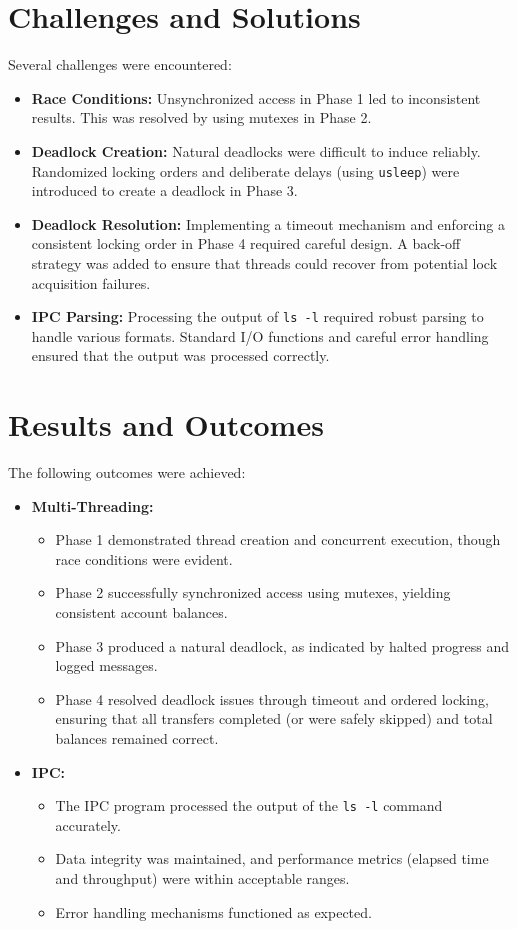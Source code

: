 \documentclass[11pt]{article}
\begin{document}
\section{Challenges and Solutions}
Several challenges were encountered:
\begin{itemize}[itemsep=0pt]
    \item \textbf{Race Conditions:} Unsynchronized access in Phase 1 led to inconsistent results. This was resolved by using mutexes in Phase 2.
    \item \textbf{Deadlock Creation:} Natural deadlocks were difficult to induce reliably. Randomized locking orders and deliberate delays (using \texttt{usleep}) were introduced to create a deadlock in Phase 3.
    \item \textbf{Deadlock Resolution:} Implementing a timeout mechanism and enforcing a consistent locking order in Phase 4 required careful design. A back-off strategy was added to ensure that threads could recover from potential lock acquisition failures.
    \item \textbf{IPC Parsing:} Processing the output of \texttt{ls -l} required robust parsing to handle various formats. Standard I/O functions and careful error handling ensured that the output was processed correctly.
\end{itemize}

\section{Results and Outcomes}
The following outcomes were achieved:
\begin{itemize}[itemsep=0pt]
    \item \textbf{Multi-Threading:}
    \begin{itemize}[itemsep=0pt]
        \item Phase 1 demonstrated thread creation and concurrent execution, though race conditions were evident.
        \item Phase 2 successfully synchronized access using mutexes, yielding consistent account balances.
        \item Phase 3 produced a natural deadlock, as indicated by halted progress and logged messages.
        \item Phase 4 resolved deadlock issues through timeout and ordered locking, ensuring that all transfers completed (or were safely skipped) and total balances remained correct.
    \end{itemize}
    \item \textbf{IPC:}
    \begin{itemize}[itemsep=0pt]
        \item The IPC program processed the output of the \texttt{ls -l} command accurately.
        \item Data integrity was maintained, and performance metrics (elapsed time and throughput) were within acceptable ranges.
        \item Error handling mechanisms functioned as expected.
    \end{itemize}
\end{itemize}
\end{document}
